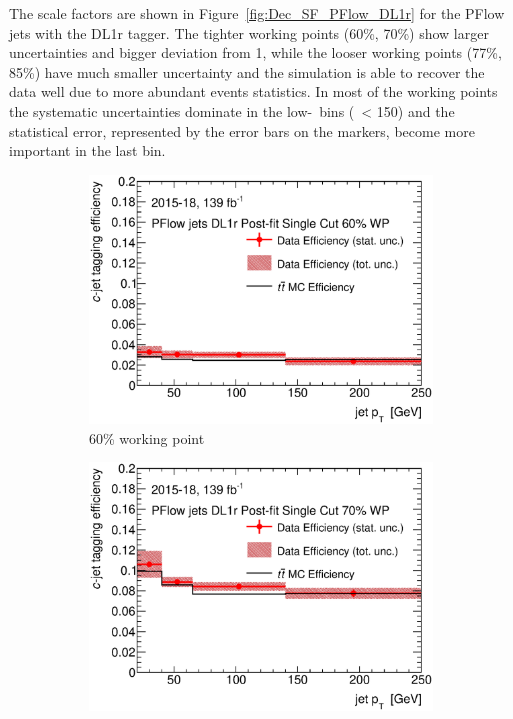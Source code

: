 \documentclass[twoside,11pt]{report}
\begin{document}
    The scale factors are shown in Figure~\ref{fig:Dec_SF_PFlow_DL1r} for the PFlow jets
    with the DL1r tagger. 
    The tighter working points (60\%, 70\%) show larger uncertainties and bigger deviation from 1, while
    the looser working points (77\%, 85\%) have much smaller uncertainty and the simulation is able to 
    recover the data well due to more abundant events statistics.
    In most of the working points the systematic uncertainties dominate 
    in the low-\pt\ bins (\pt\ < 150) and the statistical error, represented by the error bars on the 
    markers, become more important in the last bin. 
    \newline
    \begin{figure}[htbp]
    \centering
    \begin{subfigure}[t]{.35\linewidth}
    \includegraphics[width=1\textwidth]{FTAG_plots/DL1rallPFlowDec/eff60.eps}
    \caption{60\% working point}
    \end{subfigure}
    \begin{subfigure}[t]{.35\linewidth}
    \includegraphics[width=1\textwidth]{FTAG_plots/DL1rallPFlowDec/eff70.eps}

\end{subfigure}
\end{figure}
\end{document}
